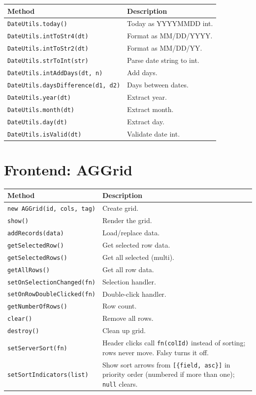 \begin{longtable}{P{4.8cm}P{5.7cm}}
\toprule
\textbf{Method} & \textbf{Description} \\
\midrule
\endhead
\texttt{DateUtils.today()} & Today as YYYYMMDD int. \\
\texttt{DateUtils.intToStr4(dt)} & Format as MM/DD/YYYY. \\
\texttt{DateUtils.intToStr2(dt)} & Format as MM/DD/YY. \\
\texttt{DateUtils.strToInt(str)} & Parse date string to int. \\
\texttt{DateUtils.intAddDays(dt, n)} & Add days. \\
\texttt{DateUtils.\allowbreak daysDifference(\allowbreak d1, d2)} & Days between dates. \\
\texttt{DateUtils.year(dt)} & Extract year. \\
\texttt{DateUtils.month(dt)} & Extract month. \\
\texttt{DateUtils.day(dt)} & Extract day. \\
\texttt{DateUtils.isValid(dt)} & Validate date int. \\
\bottomrule
\end{longtable}

\section{Frontend: AGGrid}
\label{sec:api-aggrid}

\begin{longtable}{P{4.8cm}P{5.7cm}}
\toprule
\textbf{Method} & \textbf{Description} \\
\midrule
\endhead
\texttt{new AGGrid(id, cols, tag)} & Create grid. \\
\texttt{show()} & Render the grid. \\
\texttt{addRecords(data)} & Load/replace data. \\
\texttt{getSelectedRow()} & Get selected row data. \\
\texttt{getSelectedRows()} & Get all selected (multi). \\
\texttt{getAllRows()} & Get all row data. \\
\texttt{setOnSelectionChanged(\allowbreak fn)} & Selection handler. \\
\texttt{setOnRowDoubleClicked(\allowbreak fn)} & Double-click handler. \\
\texttt{getNumberOfRows()} & Row count. \\
\texttt{clear()} & Remove all rows. \\
\texttt{destroy()} & Clean up grid. \\
\texttt{setServerSort(fn)} & Header clicks call \texttt{fn(colId)} instead of sorting; rows never move. Falsy turns it off. \\
\texttt{setSortIndicators(\allowbreak list)} & Show sort arrows from \texttt{[\{field, asc\}]} in priority order (numbered if more than one); \texttt{null} clears. \\
\bottomrule
\end{longtable}

